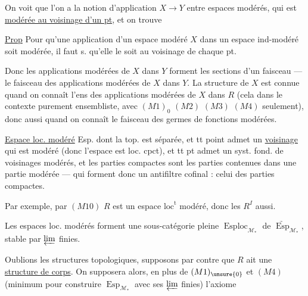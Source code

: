 On voit  que l'on a la notion d'application $X\longrightarrow Y$ entre espaces modérés, qui est \uline{modérée au voisinage d'un pt}, et on trouve

\uline{Prop} Pour qu'une application d'un espace modéré $X$ dans un espace ind-modéré soit modérée, il faut s. qu'elle le soit au voisinage de chaque pt.

Donc les applications modérées de $X$ dans $Y$ forment les sections d'un faisceau --- le faisceau des applications modérées de $X$ dans $Y$. La structure  de $X$ est connue quand on connaît l'ens des applications modérées de $X$ dans $R$ (cela  dans le contexte purement ensembliste, avec $(M1)_0$ $(M2)$ $(M3)$ $(M4)$ seulement), donc aussi quand on connaît le faisceau des germes de fonctions modérées.

\uline{Espace loc. modéré} Esp.   dont la top. est  séparée, et tt point admet un \uline{voisinage} qui est  modéré (donc l'espace est loc. cpct), et tt pt admet un syst. fond. de voisinages modérés, et les parties compactes sont les parties contenues dans une partie modérée --- qui forment donc un antifiltre cofinal : celui des parties compactes.

Par exemple, par $(M10)$ $R$ est un espace $\mathrm{loc}^{\mathrm t}$ modéré, donc les $R^I$ aussi.

Les espaces loc. modérés  forment une sous-catégorie pleine $\operatorname{Esploc}_{\mathcal M_*}$ de $\underrightarrow{\operatorname{Esp}}_{\mathcal M_*}$, stable par $\varprojlim$ finies.


Oublions les structures topologiques, supposons par contre que $R$ ait une \uline{structure de corps}. On supposera alors,  en plus de $(M1)_{\unsure{0}}$ et $(M4)$ (minimum pour construire $\operatorname{Esp}_{\mathcal M_*}$ avec ses $\varprojlim$ finies) l'axiome


